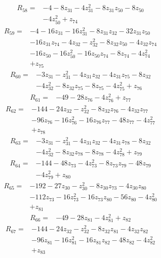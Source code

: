 \begin{align*}
R_{58}={}&-4-8z_{31}-4z_{31}^{2}-8z_{31}z_{50}-8z_{50}\\
&-4z_{50}^{2}+z_{74}
\end{align*}
\begin{align*}
R_{59}={}&-4-16z_{31}-16z_{31}^{2}-8z_{31}z_{32}-32z_{31}z_{50}\\
&-16z_{31}z_{74}-4z_{32}-z_{32}^{2}-8z_{32}z_{50}-4z_{32}z_{74}\\
&-16z_{50}-16z_{50}^{2}-16z_{50}z_{74}-8z_{74}-4z_{74}^{2}\\
&+z_{75}
\end{align*}
\begin{align*}
R_{60}={}&-3z_{31}-z_{31}^{2}-4z_{31}z_{32}-4z_{31}z_{75}-8z_{32}\\
&-4z_{32}^{2}-8z_{32}z_{75}-8z_{75}-4z_{75}^{2}+z_{76}
\end{align*}
\begin{align*}
R_{61}={}&-49-28z_{76}-4z_{76}^{2}+z_{77}
\end{align*}
\begin{align*}
R_{62}={}&-144-24z_{32}-z_{32}^{2}-8z_{32}z_{76}-4z_{32}z_{77}\\
&-96z_{76}-16z_{76}^{2}-16z_{76}z_{77}-48z_{77}-4z_{77}^{2}\\
&+z_{78}
\end{align*}
\begin{align*}
R_{63}={}&-3z_{31}-z_{31}^{2}-4z_{31}z_{32}-4z_{31}z_{78}-8z_{32}\\
&-4z_{32}^{2}-8z_{32}z_{78}-8z_{78}-4z_{78}^{2}+z_{79}
\end{align*}
\begin{align*}
R_{64}={}&-144-48z_{73}-4z_{73}^{2}-8z_{73}z_{79}-48z_{79}\\
&-4z_{79}^{2}+z_{80}
\end{align*}
\begin{align*}
R_{65}={}&-192-27z_{30}-z_{30}^{2}-8z_{30}z_{73}-4z_{30}z_{80}\\
&-112z_{73}-16z_{73}^{2}-16z_{73}z_{80}-56z_{80}-4z_{80}^{2}\\
&+z_{81}
\end{align*}
\begin{align*}
R_{66}={}&-49-28z_{81}-4z_{81}^{2}+z_{82}
\end{align*}
\begin{align*}
R_{67}={}&-144-24z_{32}-z_{32}^{2}-8z_{32}z_{81}-4z_{32}z_{82}\\
&-96z_{81}-16z_{81}^{2}-16z_{81}z_{82}-48z_{82}-4z_{82}^{2}\\
&+z_{83}
\end{align*}
